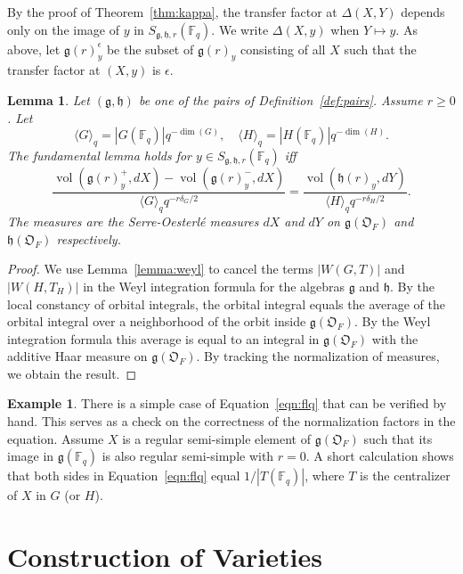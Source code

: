 \documentclass[11pt]{amsart}
\newtheorem{lemma}[theorem]{Lemma}
\theoremstyle{definition}
\newtheorem{example}[theorem]{Example}
\theoremstyle{remark}
\numberwithin{equation}{theorem}
\def\F{{F}}
\def\A{{\mathfrak{O}_\F}}
\def\f{{\mathbb{F}_q}}
\def\vol{{\operatorname{vol}}}
\newcommand{\ring}[1]{\mathbb{#1}}
\def\op#1{\operatorname{#1}}
\def\lie#1{{\mathfrak{#1}}}
\def\vol{\operatorname{vol}}
\begin{document}
By the proof of Theorem~\ref{thm:kappa}, the transfer factor at
$\Delta(X,Y)$ depends only on the image of $y$ in
$S_{\lie{g},\lie{h},r}(\f)$.  We write $\Delta(X,y)$ when
$Y\mapsto y$.  As above, let $\lie{g}(r)^\epsilon_y$ be the subset
of $\lie{g}(r)_y$ consisting of all $X$ such that the transfer
factor at $(X,y)$ is $\epsilon$.


\begin{lemma}\label{lemma:fld}
Let $(\lie{g},\lie{h})$ be one of the pairs of
Definition~\ref{def:pairs}.  Assume $r\ge 0$.  Let
    $$
    \langle G\rangle_q =|G(\ring{F}_q)| q^{-\op{dim}(G)},\quad
    \langle H\rangle_q =|H(\ring{F}_q)| q^{-\op{dim}(H)}.
    $$
    The fundamental lemma holds for $y\in S_{\lie{g},\lie{h},r}(\f)$ iff
    \begin{equation}
    \frac{\vol(\lie{g}(r)^+_y,dX)-\vol(\lie{g}(r)^-_y,dX)}
      {\langle G\rangle_q q^{-r\delta_G/2}} =
    \frac{\vol(\lie{h}(r)_y,dY)}
      {\langle H\rangle_q q^{-r\delta_H/2}}.
      \label{eqn:flq}
    \end{equation}
The measures are the Serre-Oesterl\'e measures $dX$ and $dY$ on
$\lie{g}(\A)$ and $\lie{h}(\A)$ respectively.
\end{lemma}

\begin{proof}  We use Lemma~\ref{lemma:weyl} to cancel the terms
$|W(G,T)|$ and $|W(H,T_H)|$ in the Weyl integration formula for
the algebras $\lie{g}$ and $\lie{h}$.   By the local constancy of
orbital integrals, the orbital integral equals the average of the
orbital integral over a neighborhood of the orbit inside
$\lie{g}(\A)$. By the Weyl integration formula this average is
equal to an integral in $\lie{g}(\A)$ with the additive Haar
measure on $\lie{g}(\A)$. By tracking the normalization of
measures, we obtain the result.
\end{proof}

\begin{example}  There is a simple case of Equation~\ref{eqn:flq} that can
be verified by hand.  This serves as a check on the correctness of
the normalization factors in the equation.  Assume $X$ is a
regular semi-simple element of $\lie{g}(\A)$ such that its image
in $\lie{g}(\f)$ is also regular semi-simple with $r=0$. A short
calculation shows that both sides in Equation~\ref{eqn:flq} equal
$1/|T(\f)|$, where $T$ is the centralizer of $X$ in $G$ (or $H$).
\end{example}


\section{Construction of Varieties}
\end{document}
